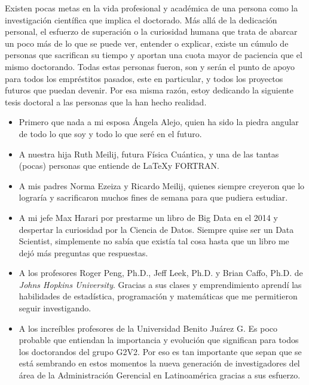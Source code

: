 \clearpage
\begin{center}
    \thispagestyle{empty}
    \vspace*{\fill}
        Existen pocas metas en la vida profesional y académica de una persona como la investigación científica que implica el doctorado. Más allá de la dedicación personal, el esfuerzo de superación o la curiosidad humana que trata de abarcar un poco más de lo que se puede ver, entender o explicar, existe un cúmulo de personas que sacrifican su tiempo y aportan una cuota mayor de paciencia que el mismo doctorando. Todas estas personas fueron, son y serán el punto de apoyo para todos los empréstitos pasados, este en particular, y todos los proyectos futuros que puedan devenir. Por esa misma razón, estoy dedicando la siguiente tesis doctoral a las personas que la han hecho realidad.

        \begin{itemize}
            \item Primero que nada a mi esposa Ángela Alejo, quien ha sido la piedra angular de todo lo que soy y todo lo que seré en el futuro.
            \item A nuestra hija Ruth Meilij, futura Física Cuántica, y una de las tantas (pocas) personas que entiende de \LaTeX y FORTRAN.
            \item A mis padres Norma Ezeiza y Ricardo Meilij, quienes siempre creyeron que lo lograría y sacrificaron muchos fines de semana para que pudiera estudiar.
            \item A mi jefe Max Harari por prestarme un libro de Big Data en el 2014 y despertar la curiosidad por la Ciencia de Datos. Siempre quise ser un Data Scientist, simplemente no sabía que existía tal cosa hasta que un libro me dejó más preguntas que respuestas.
            \item A los profesores Roger Peng, Ph.D., Jeff Leek, Ph.D. y Brian Caffo, Ph.D. de \emph{Johns Hopkins University}. Gracias a sus clases y emprendimiento aprendí las habilidades de estadística, programación y matemáticas que me permitieron seguir investigando.
            \item A los increíbles profesores de la Universidad Benito Juárez G. Es poco probable que entiendan la importancia y evolución que significan para todos los doctorandos del grupo G2V2. Por eso es tan importante que sepan que se está sembrando en estos momentos la nueva generación de investigadores del área de la Administración Gerencial en Latinoamérica gracias a sus esfuerzo.
        \end{itemize}
    \vspace*{\fill}
    \end{center}
\clearpage
